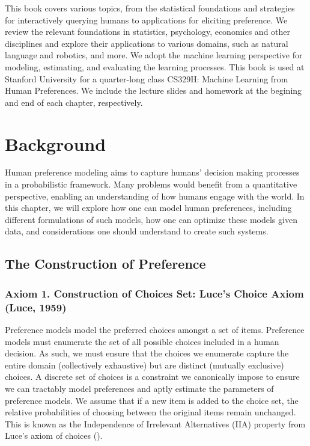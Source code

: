 \documentclass[
  letterpaper,
  numbers=noenddot,
  DIV=11]{scrreprt}
\let\oldchapter\chapter
\def\chapter{%
  \setcounter{sidenote}{1}%
  \oldchapter
}
\theoremstyle{plain}
\theoremstyle{definition}
\theoremstyle{remark}
\begin{document}
This book covers various topics, from the statistical foundations and
strategies for interactively querying humans to applications for
eliciting preference. We review the relevant foundations in statistics,
psychology, economics and other disciplines and explore their
applications to various domains, such as natural language and robotics,
and more. We adopt the machine learning perspective for modeling,
estimating, and evaluating the learning processes. This book is used at
Stanford University for a quarter-long class CS329H: Machine Learning
from Human Preferences. We include the lecture slides and homework at
the begining and end of each chapter, respectively.


\chapter{Background}\label{background}

Human preference modeling aims to capture humans' decision making
processes in a probabilistic framework. Many problems would benefit from
a quantitative perspective, enabling an understanding of how humans
engage with the world. In this chapter, we will explore how one can
model human preferences, including different formulations of such
models, how one can optimize these models given data, and considerations
one should understand to create such systems.

\section{The Construction of Preference}\label{sec-foundations}

\subsection{Axiom 1. Construction of Choices Set: Luce's Choice Axiom
(Luce, 1959)}\label{axiom-1-preference-models-model-choice}

Preference models model the preferred choices amongst a set of items.
Preference models must enumerate the set of all possible choices
included in a human decision. As such, we must ensure that the choices
we enumerate capture the entire domain (collectively exhaustive) but are
distinct (mutually exclusive) choices. A discrete set of choices is a
constraint we canonically impose to ensure we can tractably model
preferences and aptly estimate the parameters of preference models. We
assume that if a new item is added to the choice set, the relative
probabilities of choosing between the original items remain unchanged.
This is known as the Independence of Irrelevant Alternatives (IIA)
property from Luce's axiom of choices ().
\end{document}
